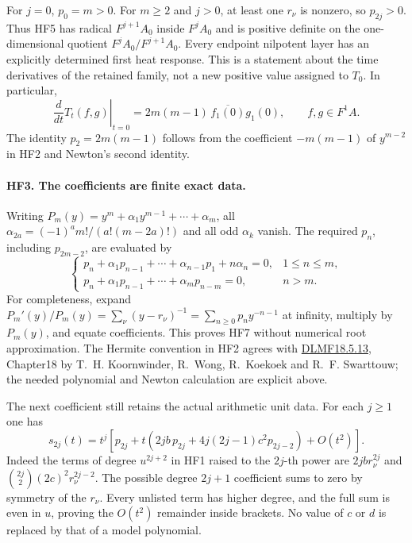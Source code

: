 \documentclass[11pt,a4paper]{article}
\theoremstyle{definition}\newtheorem{definition}[theorem]{Definition}
\begin{document}
For $j=0$, $p_0=m>0$. For $m\ge2$ and $j>0$, at least one
$r_\nu$ is nonzero, so $p_{2j}>0$. Thus HF5 has radical
$F^{j+1}A_0$ inside $F^jA_0$ and is positive definite on the
one-dimensional quotient $F^jA_0/F^{j+1}A_0$.
Every endpoint nilpotent layer has an explicitly determined
first heat response. This is a statement about the time derivatives
of the retained family, not a new positive value assigned to $T_0$.
In particular,
\[
 \left.\frac d{dt}T_t(f,g)\right|_{t=0}
    =2m(m-1)\,\overline{f_1(0)}g_1(0),
       \qquad f,g\in F^1A.
 \tag{HF6}
\]
The identity $p_2=2m(m-1)$ follows from the coefficient
$-m(m-1)$ of $y^{m-2}$ in HF2 and Newton's second identity.

\paragraph{HF3. The coefficients are finite exact data.}
Writing $P_m(y)=y^m+\alpha_1y^{m-1}+\cdots+\alpha_m$, all
$\alpha_{2a}=(-1)^a m!/(a!(m-2a)!)$ and all odd $\alpha_k$ vanish.
The required $p_n$, including $p_{2m-2}$, are evaluated by
\[
 \begin{cases}
 p_n+\alpha_1p_{n-1}+\cdots+\alpha_{n-1}p_1+n\alpha_n=0,
          &1\le n\le m,\\
 p_n+\alpha_1p_{n-1}+\cdots+\alpha_m p_{n-m}=0,&n>m.
 \end{cases}
 \tag{HF7}
\]
For completeness, expand
$P_m'(y)/P_m(y)=\sum_\nu(y-r_\nu)^{-1}
=\sum_{n\ge0}p_n y^{-n-1}$ at infinity, multiply by $P_m(y)$,
and equate coefficients. This proves HF7 without numerical root
approximation. The Hermite convention in HF2 agrees with
\href{https://dlmf.nist.gov/18.5.E13}{DLMF18.5.13}, Chapter18 by
T.~H. Koornwinder, R.~Wong, R.~Koekoek and R.~F. Swarttouw;
the needed polynomial and Newton calculation are explicit above.

The next coefficient still retains the actual arithmetic unit data.
For each $j\ge1$ one has
\[
 \boxed{s_{2j}(t)=t^j\left[
    p_{2j}+t\left(2jb\,p_{2j}
                +4j(2j-1)c^2p_{2j-2}\right)+O(t^2)\right].}
 \tag{HF8}
\]
Indeed the terms of degree $u^{2j+2}$ in HF1 raised to the
$2j$-th power are $2jb r_\nu^{2j}$ and
$\binom{2j}{2}(2c)^2r_\nu^{2j-2}$. The possible degree
$2j+1$ coefficient sums to zero by symmetry of the $r_\nu$.
Every unlisted term has higher degree, and the full sum is even
in $u$, proving the $O(t^2)$ remainder inside brackets.
No value of $c$ or $d$ is replaced by that of a model polynomial.
\end{document}
